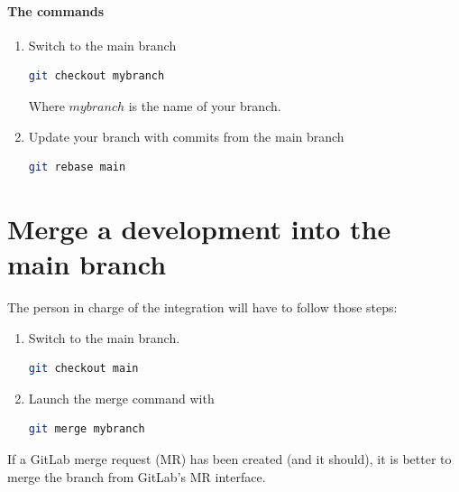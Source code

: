 \paragraph{The commands}
\begin{enumerate}
\item Switch to the main branch
\begin{lstlisting}[language=bash]
git checkout mybranch
\end{lstlisting}
Where $mybranch$ is the name of your branch.
\item Update your branch with commits from the main branch
\begin{lstlisting}[language=bash]
git rebase main
\end{lstlisting}
\end{enumerate}
\section{Merge a development into the main branch}
%
The person in charge of the integration will have to follow those steps:
\begin{enumerate}
\item Switch to the main branch.
\begin{lstlisting}[language=bash]
git checkout main
\end{lstlisting}
\item Launch the merge command with
\begin{lstlisting}[language=bash]
git merge mybranch
\end{lstlisting}
\end{enumerate}
%
If a GitLab merge request (MR) has been created (and it should), it is better
to merge the branch from GitLab's MR interface.